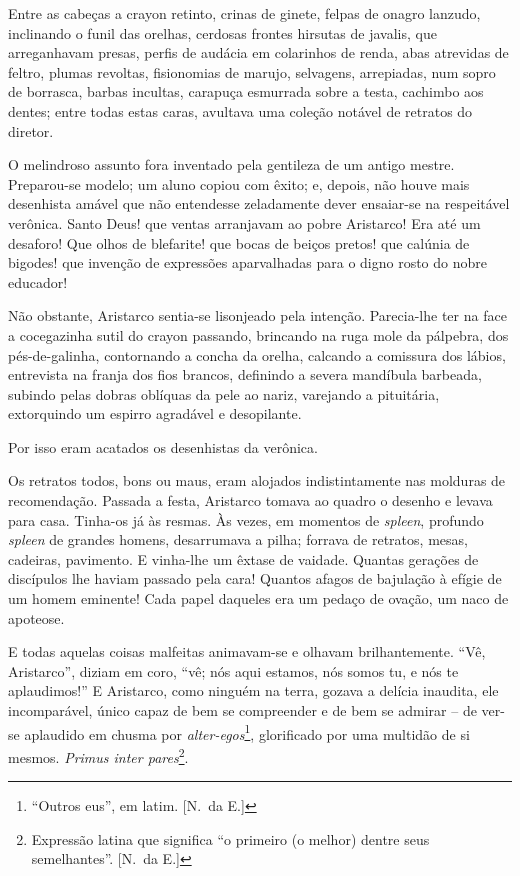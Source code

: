 Entre as cabeças a
crayon retinto, crinas de ginete, felpas de onagro lanzudo, inclinando
o funil das orelhas, cerdosas frontes hirsutas de javalis, que
arreganhavam presas, perfis de audácia em colarinhos de renda, abas
atrevidas de feltro, plumas revoltas, fisionomias de marujo, selvagens,
arrepiadas, num sopro de borrasca, barbas incultas, carapuça esmurrada
sobre a testa, cachimbo aos dentes; entre todas estas caras, avultava
uma coleção notável de retratos do diretor. 


O melindroso assunto fora
inventado pela gentileza de um antigo mestre. Preparou{}-se modelo; um
aluno copiou com êxito; e, depois, não houve mais desenhista amável que
não entendesse zeladamente dever ensaiar{}-se na respeitável verônica.
Santo Deus! que ventas arranjavam ao pobre Aristarco! Era até um
desaforo! Que olhos de blefarite! que bocas de beiços pretos! que
calúnia de bigodes! que invenção de expressões aparvalhadas para o
digno rosto do nobre educador! 

Não obstante, Aristarco sentia{}-se
lisonjeado pela intenção. Parecia{}-lhe ter na face a cocegazinha sutil
do crayon passando, brincando na ruga mole da pálpebra, dos
pés{}-de{}-galinha, contornando a concha da orelha, calcando a
comissura dos lábios, entrevista na franja dos fios brancos, definindo
a severa mandíbula barbeada, subindo pelas dobras oblíquas da pele ao
nariz, varejando a pituitária, extorquindo um espirro agradável e
desopilante. 

Por isso eram acatados os desenhistas da verônica. 

Os retratos todos, bons ou maus, eram alojados indistintamente nas
molduras de recomendação. Passada a festa, Aristarco tomava ao quadro o
desenho e levava para casa. Tinha{}-os já às resmas. Às vezes, em
momentos de \textit{spleen}, profundo \textit{spleen} de grandes homens, desarrumava a
pilha; forrava de retratos, mesas, cadeiras, pavimento. E vinha{}-lhe
um êxtase de vaidade. Quantas gerações de discípulos lhe haviam passado
pela cara! Quantos afagos de bajulação à efígie de um homem eminente!
Cada papel daqueles era um pedaço de ovação, um naco de apoteose. 

E todas aquelas coisas malfeitas animavam{}-se e olhavam brilhantemente.
``Vê, Aristarco'', diziam em coro, ``vê; nós aqui estamos, nós somos tu, e
nós te aplaudimos!'' E Aristarco, como ninguém na terra,
gozava a delícia inaudita, ele incomparável, único capaz de bem se
compreender e de bem se admirar -- de ver{}-se aplaudido em chusma por
\textit{alter{}-egos}\footnote{ ``Outros eus'', em latim. [N.~da E.]}, 
glorificado por uma multidão de si mesmos. \textit{Primus inter
pares}\footnote{ Expressão latina que significa ``o primeiro (o melhor) 
dentre seus semelhantes''. [N.~da E.]}. 

